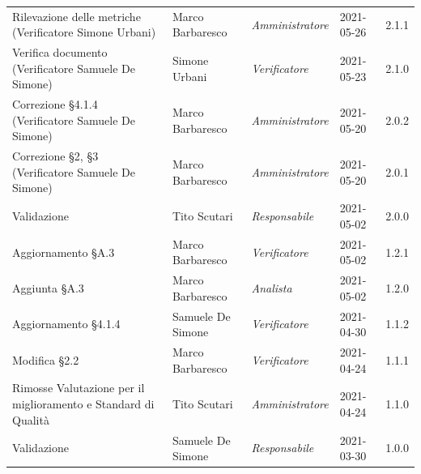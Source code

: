\documentclass[a4paper]{article}
\begin{document}
\begin{center}
\begin{table}[h!]
\begin{tabular}{p{150px} p{90px} p{70px} p{60px} p{45px}}
            Rilevazione delle metriche \newline (Verificatore Simone Urbani)                         & Marco Barbaresco  & \textit{Amministratore} & 2021-05-26    & 2.1.1             \\
            Verifica documento \newline (Verificatore Samuele De Simone)                             & Simone Urbani     & \textit{Verificatore}   & 2021-05-23    & 2.1.0             \\
            Correzione \S 4.1.4 \newline (Verificatore Samuele De Simone)                            & Marco Barbaresco  & \textit{Amministratore} & 2021-05-20    & 2.0.2             \\
            Correzione \S2, \S3 \newline (Verificatore Samuele De Simone)                            & Marco Barbaresco  & \textit{Amministratore} & 2021-05-20    & 2.0.1             \\
            Validazione                                                                              & Tito Scutari      & \textit{Responsabile}   & 2021-05-02    & 2.0.0             \\
            Aggiornamento \S A.3                                                                     & Marco Barbaresco  & \textit{Verificatore}   & 2021-05-02    & 1.2.1             \\
            Aggiunta \S A.3                                                                          & Marco Barbaresco  & \textit{Analista}       & 2021-05-02    & 1.2.0             \\
            Aggiornamento \S 4.1.4                                                                   & Samuele De Simone & \textit{Verificatore}   & 2021-04-30    & 1.1.2             \\
            Modifica \S 2.2                                                                          & Marco Barbaresco  & \textit{Verificatore}   & 2021-04-24    & 1.1.1             \\
            Rimosse Valutazione per il miglioramento e Standard di Qualità                           & Tito Scutari      & \textit{Amministratore} & 2021-04-24    & 1.1.0             \\
            Validazione                                                                              & Samuele De Simone & \textit{Responsabile}   & 2021-03-30    & 1.0.0             \\

\end{tabular}
\end{table}
\end{center}
\end{document}
